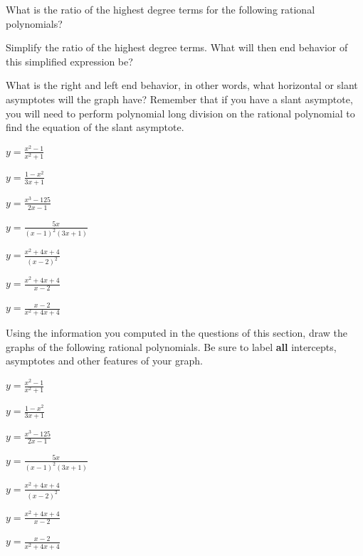 \eq

\bq \be
\item What is the ratio of the highest degree terms for the following rational polynomials?
\item Simplify the ratio of the highest degree terms. What will then end behavior of this simplified expression be?
\item What is the right and left end behavior, in other words, what horizontal or slant asymptotes will the graph have? Remember that if you have a slant asymptote, you will need to perform polynomial long division on the rational polynomial to find the equation of the slant asymptote.
\ee
\be
\item $y=\frac{x^2-1}{x^2+1}$
\item $y=\frac{1-x^2}{3x+1}$
\item $y=\frac{x^3-125}{2x-1}$
\item $y=\frac{5x}{(x-1)^2(3x+1)}$
\item $y=\frac{x^2+4x+4}{(x-2)^2}$
\item $y=\frac{x^2+4x+4}{x-2}$
\item $y=\frac{x-2}{x^2+4x+4}$
\ee
\eq

\bq Using the information you computed in the questions of this section, draw the graphs of the following rational polynomials. Be sure to label \textbf{all} intercepts, asymptotes and other features of your graph.
\be
\item $y=\frac{x^2-1}{x^2+1}$
\item $y=\frac{1-x^2}{3x+1}$
\item $y=\frac{x^3-125}{2x-1}$
\item $y=\frac{5x}{(x-1)^2(3x+1)}$
\item $y=\frac{x^2+4x+4}{(x-2)^2}$
\item $y=\frac{x^2+4x+4}{x-2}$
\item $y=\frac{x-2}{x^2+4x+4}$
\ee
\eq
\newpage

